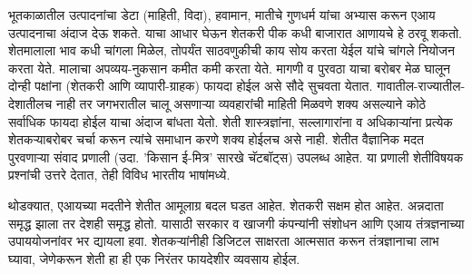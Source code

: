 भूतकाळातील उत्पादनांचा डेटा (माहिती, विदा), हवामान, मातीचे गुणधर्म यांचा अभ्यास करून एआय उत्पादनाचा अंदाज देऊ शकते. याचा आधार घेऊन शेतकरी पीक कधी बाजारात आणायचे हे ठरवू शकतो. शेतमालाला भाव कधी चांगला मिळेल, तोपर्यंत साठवणुकीची काय सोय करता येईल यांचे चांगले नियोजन करता येते. मालाचा अपव्यय-नुकसान कमीत कमी करता येते. मागणी व पुरवठा याचा बरोबर मेळ घालून दोन्ही पक्षांना (शेतकरी आणि व्यापारी-ग्राहक) फायदा होईल असे सौदे सुचवता येतात. गावातील-राज्यातील-देशातीलच नाही तर जगभरातील चालू असणाऱ्या व्यवहारांची माहिती मिळवणे शक्य असल्याने कोठे सर्वाधिक फायदा होईल याचा अंदाज बांधता येतो. शेती शास्त्रज्ञांना, सल्लागारांना व अधिकाऱ्यांना प्रत्येक शेतकऱ्याबरोबर चर्चा करून त्यांचे समाधान करणे शक्य होईलच असे नाही. शेतीत वैज्ञानिक मदत पुरवणाऱ्या संवाद प्रणाली (उदा. 'किसान ई-मित्र' सारखे चॅटबॉट्स) उपलब्ध आहेत. या प्रणाली शेतीविषयक प्रश्नांची उत्तरे देतात, तेही विविध भारतीय भाषांमध्ये.

थोडक्यात, एआयच्या मदतीने शेतीत आमूलाग्र बदल घडत आहेत. शेतकरी सक्षम होत आहेत. अन्नदाता समृद्ध झाला तर देशही समृद्ध होतो. यासाठी सरकार व खाजगी कंपन्यांनी संशोधन आणि एआय तंत्रज्ञनाच्या उपाययोजनांवर भर द्यायला हवा. शेतकऱ्यांनीही डिजिटल साक्षरता आत्मसात करून तंत्रज्ञानाचा लाभ घ्यावा, जेणेकरून शेती हा ही एक निरंतर फायदेशीर व्यवसाय होईल.